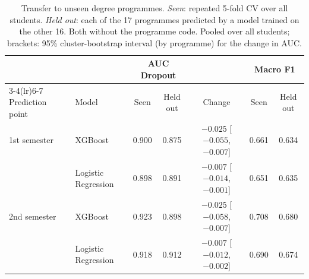 \begin{table}[H]
\centering
\small
\setlength{\tabcolsep}{4pt}
\caption{Transfer to unseen degree programmes. \emph{Seen}: repeated 5-fold CV over all students. \emph{Held out}: each of the 17 programmes predicted by a model trained on the other 16. Both without the programme code. Pooled over all students; brackets: 95\% cluster-bootstrap interval (by programme) for the change in AUC.}
\label{tab:transfer}
\begin{tabular}{llccccc}
\toprule
 & & \multicolumn{2}{c}{AUC Dropout} & & \multicolumn{2}{c}{Macro F1} \\
\cmidrule(lr){3-4}\cmidrule(lr){6-7}
Prediction point & Model & Seen & Held out & Change & Seen & Held out \\
\midrule
1st semester & XGBoost & 0.900 & 0.875 & $-0.025$ [$-0.055$, $-0.007$] & 0.661 & 0.634 \\
 & Logistic Regression & 0.898 & 0.891 & $-0.007$ [$-0.014$, $-0.001$] & 0.651 & 0.635 \\
2nd semester & XGBoost & 0.923 & 0.898 & $-0.025$ [$-0.058$, $-0.007$] & 0.708 & 0.680 \\
 & Logistic Regression & 0.918 & 0.912 & $-0.007$ [$-0.012$, $-0.002$] & 0.690 & 0.674 \\
\bottomrule
\end{tabular}
\end{table}
